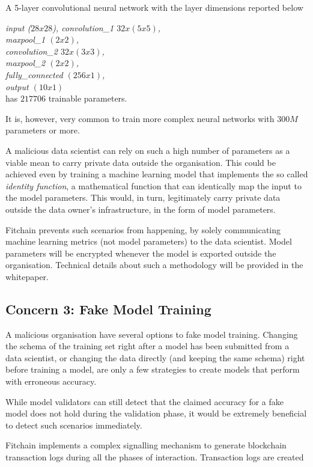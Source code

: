 \documentclass[12pt, a4paper,titlepage]{extreport}
\begin{document}
A 5-layer convolutional neural network \cite{CNN} with the layer dimensions reported below

\textit{
input ($28x28$), convolution\_1 $32x(5x5)$, \\
maxpool\_1 $(2x2)$, \\
convolution\_2 $32x(3x3)$, \\
maxpool\_2 $(2x2)$, \\
fully\_connected $(256x1)$, \\ 
output $(10x1)$ } \\

has $217706$ trainable parameters. 

It is, however, very common to train more complex neural networks with $300M$ parameters or more. 

A malicious data scientist can rely on such a high number of parameters as a viable mean to carry private data outside the organisation. This could be achieved even by training a machine learning model that implements the so called \textit{identity function}, a mathematical function that can identically map the input to the model parameters. This would, in turn, legitimately carry private data outside the data owner's infrastructure, in the form of model parameters. 

Fitchain prevents such scenarios from happening, by solely communicating machine learning metrics (not model parameters) to the data scientist. Model parameters will be encrypted whenever the model is exported outside the organisation. Technical details about such a methodology will be provided in the whitepaper.

\subsection{Concern 3: Fake Model Training}
A malicious organisation have several options to fake model training. Changing the schema of the training set right after a model has been submitted from a data scientist, or changing the data directly (and keeping the same schema) right before training a model, are only a few strategies to create models that perform with erroneous accuracy.

While model validators can still detect that the claimed accuracy for a fake model does not hold during the validation phase, it would be extremely beneficial to detect such scenarios immediately. 

Fitchain implements a complex signalling mechanism to generate blockchain transaction logs during all the phases of interaction. Transaction logs are created  
\end{document}
